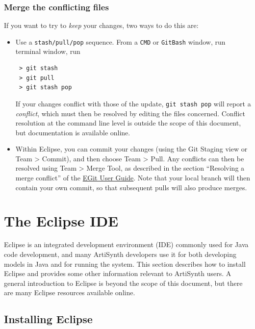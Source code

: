 \subsubsection{Merge the conflicting files}

If you want to try to {\it keep} your changes, two ways
to do this are:

\begin{itemize}

\item Use a {\tt stash/pull/pop} sequence. From a
\ifWindows
{\tt CMD} or {\tt GitBash} window, run
\else
terminal window, run
\fi
\begin{verbatim}
 > git stash
 > git pull
 > git stash pop
\end{verbatim}
If your changes conflict with those of the update, {\tt git stash pop}
will report a {\it conflict}, which must then be resolved by editing
the files concerned. Conflict resolution at the command
line level is outside the scope of this document, but documentation
is available online.

\item Within Eclipse, you can commit your changes (using the
{\sf Git Staging} view or {\sf Team > Commit}), and then choose {\sf
Team > Pull}. Any conflicts can then be resolved using {\sf Team >
Merge Tool}, as described in the section ``Resolving a merge
conflict'' of the
\href{https://github.com/eclipse-egit/egit/wiki/User-Guide\#resolving-a-merge-conflict}%
{EGit User Guide}. Note that your local branch will then contain your
own commit, so that subsequent pulls will also produce merges.

\end{itemize}

\section{The Eclipse IDE}
\label{EclipseIDE}

Eclipse is an integrated development environment (IDE) commonly used
for Java code development, and many ArtiSynth developers use it for
both developing models in Java and for running the system. This
section describes how to install Eclipse and provides some other
information relevant to ArtiSynth users.  A general introduction to
Eclipse is beyond the scope of this document, but there are many
Eclipse resources available online.

\subsection{Installing Eclipse}
\label{InstallingEclipse}


